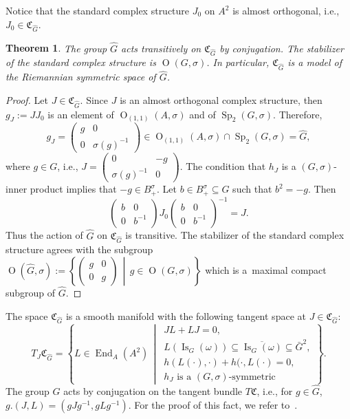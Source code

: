 \documentclass[a4paper,oneside,11pt]{amsart}
\DeclareMathOperator{\Sp}{Sp}
\DeclareMathOperator{\OO}{O}
\DeclareMathOperator{\End}{End}
\DeclareMathOperator{\Is}{Is}
\newcommand{\midwd}{\,\middle\vert\,}
\theoremstyle{plain}
\newtheorem{teo}{Theorem}[section]
\theoremstyle{definition}
\theoremstyle{remark}
\begin{document}
\noindent Notice that the standard complex structure $J_0$ on $A^2$ is almost orthogonal, i.e., $J_0\in \mathfrak C_{\hat G}$.


\begin{teo}
The group $\hat G$ acts transitively on $\mathfrak C_{\hat G}$ by conjugation. The stabilizer of the standard complex structure is $\OO(G,\sigma)$. In particular, $\mathfrak C_{\hat G}$ is a model of the Riemannian symmetric space of $\hat G$.
\end{teo}

\begin{proof}
Let $J\in \mathfrak C_{\hat G}$. Since $J$ is an almost orthogonal complex structure, then $g_J:=JJ_0$ is an element of $\OO_{(1,1)}(A,\sigma)$ and of $\Sp_{2}(G,\sigma)$. Therefore,
$$g_J=\begin{pmatrix}
    g & 0 \\
    0 & \sigma(g)^{-1}
\end{pmatrix}\in \OO_{(1,1)}(A,\sigma)\cap \Sp_2(G,\sigma)=\hat G,$$ where $g\in G$, i.e., $J=\begin{pmatrix}
    0 & -g \\
    \sigma(g)^{-1} & 0
\end{pmatrix}$. 
The condition that $h_J$ is a $(G,\sigma)$-inner product implies that $-g\in B^\sigma_+$. Let $b\in B^\sigma_+\subseteq G$ such that $b^2=-g$. Then
$$\begin{pmatrix}
    b & 0 \\
    0 & b^{-1}
\end{pmatrix} J_0 \begin{pmatrix}
    b & 0 \\
    0 & b^{-1}
\end{pmatrix}^{-1}=J.$$
Thus the action of $\hat G$ on $\mathfrak C_{\hat G}$ is transitive. The stabilizer of the standard complex structure agrees with the subgroup $\OO(\hat G,\sigma):=\left\{\begin{pmatrix}
    g & 0 \\
    0 & g
\end{pmatrix}\midwd g\in \OO(G,\sigma)\right\}$ which is a~maximal compact subgroup of $\hat G$.
\end{proof}

The space $\mathfrak{C}_{\hat G}$ is a smooth manifold with the following tangent space at $J\in\mathfrak{C}_{\hat G}$:
$$T_J\mathfrak{C}_{\hat G}=\left\{L\in\End_A(A^2)\midwd\begin{array}{l}
JL+LJ=0,\\
L(\Is_G(\omega))\subseteq\overline{\Is_G(\omega)}\subseteq \bar G^2,\\
h(L(\cdot),\cdot)+h(\cdot,L(\cdot)=0,\\
h_J\text{ is a $(G,\sigma)$-symmetric}
\end{array}\right\}.$$
The group $\hat G$ acts by conjugation on the tangent bundle $T\mathfrak{C}$, i.e., for $g\in \hat G$, $g.(J,L)=(gJg^{-1},gLg^{-1})$.
For the proof of this fact, we refer to~\cite[Proposition~4.3]{HKRW}.
\end{document}
